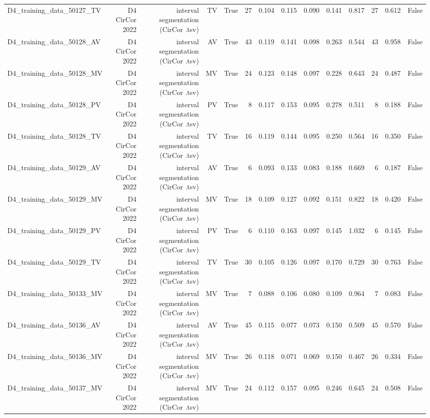 \begin{table}[htbp]
\begin{tabular}{lrrrrrrrrrrrrr}
    D4\_training\_data\_50127\_TV & D4 CirCor 2022 & interval segmentation (CirCor .tsv) & TV & True & 27 & 0.104 & 0.115 & 0.090 & 0.141 & 0.817 & 27 & 0.612 & False \\
    D4\_training\_data\_50128\_AV & D4 CirCor 2022 & interval segmentation (CirCor .tsv) & AV & True & 43 & 0.119 & 0.141 & 0.098 & 0.263 & 0.544 & 43 & 0.958 & False \\
    D4\_training\_data\_50128\_MV & D4 CirCor 2022 & interval segmentation (CirCor .tsv) & MV & True & 24 & 0.123 & 0.148 & 0.097 & 0.228 & 0.643 & 24 & 0.487 & False \\
    D4\_training\_data\_50128\_PV & D4 CirCor 2022 & interval segmentation (CirCor .tsv) & PV & True & 8 & 0.117 & 0.153 & 0.095 & 0.278 & 0.511 & 8 & 0.188 & False \\
    D4\_training\_data\_50128\_TV & D4 CirCor 2022 & interval segmentation (CirCor .tsv) & TV & True & 16 & 0.119 & 0.144 & 0.095 & 0.250 & 0.564 & 16 & 0.350 & False \\
    D4\_training\_data\_50129\_AV & D4 CirCor 2022 & interval segmentation (CirCor .tsv) & AV & True & 6 & 0.093 & 0.133 & 0.083 & 0.188 & 0.669 & 6 & 0.187 & False \\
    D4\_training\_data\_50129\_MV & D4 CirCor 2022 & interval segmentation (CirCor .tsv) & MV & True & 18 & 0.109 & 0.127 & 0.092 & 0.151 & 0.822 & 18 & 0.420 & False \\
    D4\_training\_data\_50129\_PV & D4 CirCor 2022 & interval segmentation (CirCor .tsv) & PV & True & 6 & 0.110 & 0.163 & 0.097 & 0.145 & 1.032 & 6 & 0.145 & False \\
    D4\_training\_data\_50129\_TV & D4 CirCor 2022 & interval segmentation (CirCor .tsv) & TV & True & 30 & 0.105 & 0.126 & 0.097 & 0.170 & 0.729 & 30 & 0.763 & False \\
    D4\_training\_data\_50133\_MV & D4 CirCor 2022 & interval segmentation (CirCor .tsv) & MV & True & 7 & 0.088 & 0.106 & 0.080 & 0.109 & 0.964 & 7 & 0.083 & False \\
    D4\_training\_data\_50136\_AV & D4 CirCor 2022 & interval segmentation (CirCor .tsv) & AV & True & 45 & 0.115 & 0.077 & 0.073 & 0.150 & 0.509 & 45 & 0.570 & False \\
    D4\_training\_data\_50136\_MV & D4 CirCor 2022 & interval segmentation (CirCor .tsv) & MV & True & 26 & 0.118 & 0.071 & 0.069 & 0.150 & 0.467 & 26 & 0.334 & False \\
    D4\_training\_data\_50137\_MV & D4 CirCor 2022 & interval segmentation (CirCor .tsv) & MV & True & 24 & 0.112 & 0.157 & 0.095 & 0.246 & 0.645 & 24 & 0.508 & False \\

\end{tabular}
\end{table}
